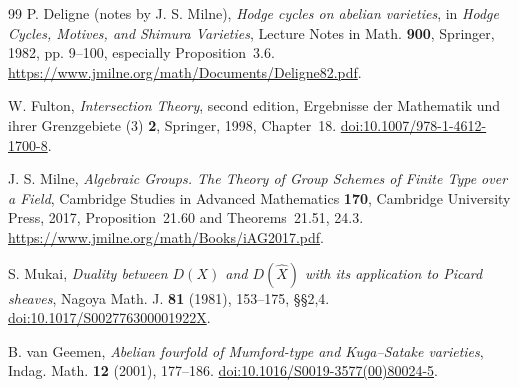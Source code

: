 \documentclass[11pt,reqno]{amsart}
\numberwithin{equation}{section}
\theoremstyle{plain}
\theoremstyle{definition}
\begin{document}
\begin{thebibliography}{99}
P. Deligne (notes by J. S. Milne),
\emph{Hodge cycles on abelian varieties},
in \emph{Hodge Cycles, Motives, and Shimura Varieties},
Lecture Notes in Math. \textbf{900}, Springer, 1982,
pp. 9--100, especially Proposition~3.6.
\url{https://www.jmilne.org/math/Documents/Deligne82.pdf}.

W. Fulton, \emph{Intersection Theory}, second edition,
Ergebnisse der Mathematik und ihrer Grenzgebiete (3)
\textbf{2}, Springer, 1998, Chapter~18.
\href{https://doi.org/10.1007/978-1-4612-1700-8}{doi:10.1007/978-1-4612-1700-8}.

J. S. Milne, \emph{Algebraic Groups. The Theory of Group
Schemes of Finite Type over a Field}, Cambridge Studies in
Advanced Mathematics \textbf{170}, Cambridge University
Press, 2017, Proposition~21.60 and Theorems~21.51, 24.3.
\url{https://www.jmilne.org/math/Books/iAG2017.pdf}.

S. Mukai, \emph{Duality between $D(X)$ and $D(\widehat X)$
with its application to Picard sheaves}, Nagoya Math. J.
\textbf{81} (1981), 153--175, \S\S2,4.
\href{https://doi.org/10.1017/S002776300001922X}{doi:10.1017/S002776300001922X}.

B. van Geemen, \emph{Abelian fourfold of Mumford-type and
Kuga--Satake varieties}, Indag. Math. \textbf{12} (2001),
177--186.
\href{https://doi.org/10.1016/S0019-3577(00)80024-5}{doi:10.1016/S0019-3577(00)80024-5}.

\end{thebibliography}
\end{document}
